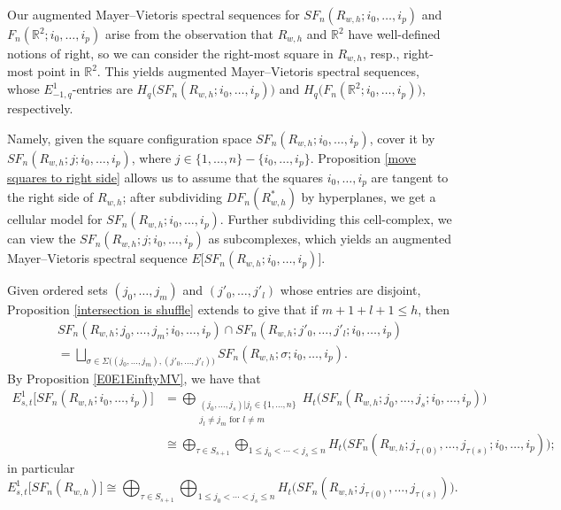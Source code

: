 \documentclass[pagebackref,colorlinks,citecolor=blue,linkcolor=blue,urlcolor=blue,filecolor=blue]{article}
\theoremstyle{definition}\newtheorem{definition}[thm]{Definition}
\theoremstyle{definition}
\newcommand{\R}{\ensuremath{\mathbb{R}}}
\begin{document}
Our augmented Mayer--Vietoris spectral sequences for $SF_{n}(R_{w,h};i_{0}, \dots, i_{p})$ and $F_{n}(\R^{2}; i_{0}, \dots, i_{p})$ arise from the observation that $R_{w,h}$ and $\R^{2}$ have well-defined notions of right, so we can consider the right-most square in $R_{w,h}$, resp., right-most point in $\R^{2}$.
This yields augmented Mayer--Vietoris spectral sequences, whose $E^{1}_{-1,q}$-entries are $H_{q}\big(SF_{n}(R_{w,h}; i_{0}, \dots, i_{p})\big)$ and $H_{q}\big(F_{n}(\R^{2}; i_{0}, \dots, i_{p})\big)$, respectively.

Namely, given the square configuration space $SF_{n}(R_{w,h}; i_{0}, \dots, i_{p})$, cover it by $SF_{n}(R_{w,h}; j;i_{0}, \dots, i_{p})$, where $j\in \{1,\dots, n\}-\{i_{0}, \dots, i_{p}\}$.
Proposition \ref{move squares to right side} allows us to assume that the squares $i_{0}, \dots, i_{p}$ are tangent to the right side of $R_{w,h}$; after subdividing $DF_{n}(R^{*}_{w,h})$ by hyperplanes,  we get a cellular model for $SF_{n}(R_{w,h}; i_{0}, \dots, i_{p})$.
Further subdividing this cell-complex, we can view the $SF_{n}(R_{w,h}; j;i_{0}, \dots, i_{p})$ as subcomplexes, which yields 
an augmented Mayer--Vietoris spectral sequence $E\big[SF_{n}(R_{w,h};  i_{0}, \dots, i_{p})\big]$.

Given ordered sets $(j_{0},\dots, j_{m})$ and $(j'_{0}, \dots, j'_{l})$ whose entries are disjoint, Proposition \ref{intersection is shuffle} extends to give that if $m+1+l+1\le h$, then
\begin{multline*}
SF_{n}(R_{w,h};j_{0}, \dots, j_{m}; i_{0}, \dots, i_{p})\cap SF_{n}(R_{w,h};j'_{0}, \dots, j'_{l};i_{0}, \dots, i_{p})\\=\bigsqcup_{\sigma\in \Sigma\big((j_{0}, \dots, j_{m}),(j'_{0}, \dots, j'_{l})\big)}SF_{n}(R_{w,h}; \sigma;i_{0}, \dots, i_{p}).
\end{multline*}
By Proposition \ref{E0E1EinftyMV}, we have that 
\begin{align*}
E^{1}_{s,t}\big[SF_{n}(R_{w,h};  i_{0}, \dots, i_{p})\big]&=\bigoplus_{\substack{(j_{0}, \dots, j_{s})|j_{l}\in\{1,\dots,n\}\\j_{l}\neq j_{m}\text{ for }l\neq m}}H_{t}\big(SF_{n}(R_{w,h};  j_{0}, \dots, j_{s};i_{0}, \dots, i_{p})\big)\\
&\cong\bigoplus_{\tau\in S_{s+1}}\bigoplus_{1\le j_{0}<\cdots<j_{s}\le n}H_{t}\big(SF_{n}(R_{w,h};  j_{\tau(0)}, \dots, j_{\tau(s)};i_{0}, \dots, i_{p})\big);
\end{align*}
in particular
\[
E^{1}_{s,t}\big[SF_{n}(R_{w,h})\big]\cong\bigoplus_{\tau\in S_{s+1}}\bigoplus_{1\le j_{0}<\cdots<j_{s}\le n}H_{t}\big(SF_{n}(R_{w,h};  j_{\tau(0)}, \dots, j_{\tau(s)})\big).
\]
\end{document}
